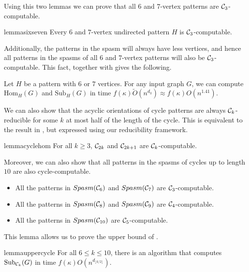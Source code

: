 \documentclass[a4paper,UKenglish,cleveref, autoref, numberwithinsect, thm-restate]{lipics-v2021}
\newcommand{\reducible}[1]{${#1}$-reducible}
\newcommand{\computable}[1]{${#1}$-computable}
\newcommand{\cycle}[1]{\cC_{#1}}
\newcommand{\Hom}[2]{\mathrm{Hom}_{#2}(#1)}
\newcommand{\Sub}[2]{\mathrm{Sub}_{#2}(#1)}
\newcommand{\Spasm}{Spasm}
\newcommand{\degen}{\kappa}
\newcommand{\cC}{{\cal C}}
\begin{document}
	Using this two lemmas we can prove that all $6$ and $7$-vertex patterns are \computable{\cycle{3}}.
	
	\begin{restatable}{lemma}{sixseven} \label{lem:sixseven}
		Every $6$ and $7$-vertex undirected pattern $H$ is \computable{\cycle{3}}.
	\end{restatable}

	Additionally, the patterns in the spasm will always have less vertices, and hence all patterns in the spasms of all $6$ and $7$-vertex patterns will also be \computable{\cycle{3}}. This fact, together with  gives the following.

	\begin{corollary} \label{cor:sixseven}
		Let $H$ be a pattern with $6$ or $7$ vertices. For any input graph $G$, we can compute $\Hom{G}{H}$ and $\Sub{G}{H}$ in time $f(\degen)\tilde{O}(n^{d_3}) \approx f(\degen)O(n^{1.41})$.
	\end{corollary}
	
	We can also show that the acyclic orientations of cycle patterns are always \reducible{\cycle{k}} for some $k$ at most half of the length of the cycle. This is equivalent to the result in \cite{GiLeSh+23}, but expressed using our reducibility framework.
	
	\begin{restatable}{lemma}{cyclehom}  \label{lem:cycle_hom}
		For all $k\geq3$, $\cycle{2k}$ and $\cycle{2k+1}$ are \computable{\cycle{k}}.
	\end{restatable}


	Moreover, we can also show that all patterns in the spasms of cycles up to length $10$ are also cycle-computable.
	
	\begin{lemma} \label{lem:spasms}
		\begin{itemize}
			\item All the patterns in $\Spasm(\cycle{6})$ and $\Spasm(\cycle{7})$ are \computable{\cycle{3}}.
			\item All the patterns in $\Spasm(\cycle{8})$ and $\Spasm(\cycle{9})$ are \computable{\cycle{4}}.
			\item All the patterns in $\Spasm(\cycle{10})$ are \computable{\cycle{5}}.
		\end{itemize}
	\end{lemma}

	This lemma allows us to prove the upper bound of .
	\begin{restatable}{lemma}{uppercycle} \label{lem:uppercycle}
		For all $6\leq k\leq 10$, there is an algorithm that computes $\Sub{G}{\cycle{k}}$ in time $f(\degen)O(n^{d_{\lfloor k/2\rfloor}})$.
	\end{restatable}
	
\end{document}
